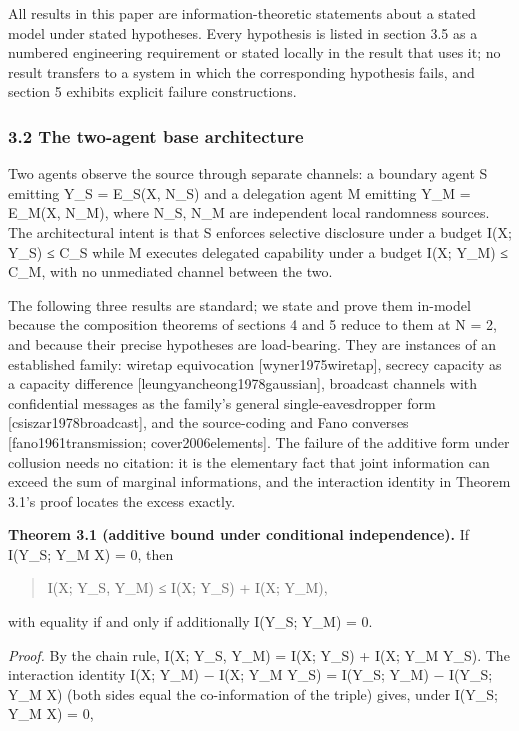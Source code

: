 \documentclass[
  11pt,
]{article}
\begin{document}
All results in this paper are information-theoretic statements about a
stated model under stated hypotheses. Every hypothesis is listed in
section 3.5 as a numbered engineering requirement or stated locally in
the result that uses it; no result transfers to a system in which the
corresponding hypothesis fails, and section 5 exhibits explicit failure
constructions.

\subsubsection{3.2 The two-agent base
architecture}\label{the-two-agent-base-architecture}

Two agents observe the source through separate channels: a boundary
agent S emitting Y\_S = E\_S(X, N\_S) and a delegation agent M emitting
Y\_M = E\_M(X, N\_M), where N\_S, N\_M are independent local randomness
sources. The architectural intent is that S enforces selective
disclosure under a budget I(X; Y\_S) ≤ C\_S while M executes delegated
capability under a budget I(X; Y\_M) ≤ C\_M, with no unmediated channel
between the two.

The following three results are standard; we state and prove them
in-model because the composition theorems of sections 4 and 5 reduce to
them at N = 2, and because their precise hypotheses are load-bearing.
They are instances of an established family: wiretap equivocation
{[}wyner1975wiretap{]}, secrecy capacity as a capacity difference
{[}leungyancheong1978gaussian{]}, broadcast channels with confidential
messages as the family's general single-eavesdropper form
{[}csiszar1978broadcast{]}, and the source-coding and Fano converses
{[}fano1961transmission; cover2006elements{]}. The failure of the
additive form under collusion needs no citation: it is the elementary
fact that joint information can exceed the sum of marginal informations,
and the interaction identity in Theorem 3.1's proof locates the excess
exactly.

\textbf{Theorem 3.1 (additive bound under conditional independence).} If
I(Y\_S; Y\_M \textbar{} X) = 0, then

\begin{quote}
I(X; Y\_S, Y\_M) ≤ I(X; Y\_S) + I(X; Y\_M),
\end{quote}

with equality if and only if additionally I(Y\_S; Y\_M) = 0.

\emph{Proof.} By the chain rule, I(X; Y\_S, Y\_M) = I(X; Y\_S) + I(X;
Y\_M \textbar{} Y\_S). The interaction identity I(X; Y\_M) − I(X; Y\_M
\textbar{} Y\_S) = I(Y\_S; Y\_M) − I(Y\_S; Y\_M \textbar{} X) (both
sides equal the co-information of the triple) gives, under I(Y\_S; Y\_M
\textbar{} X) = 0,
\end{document}
